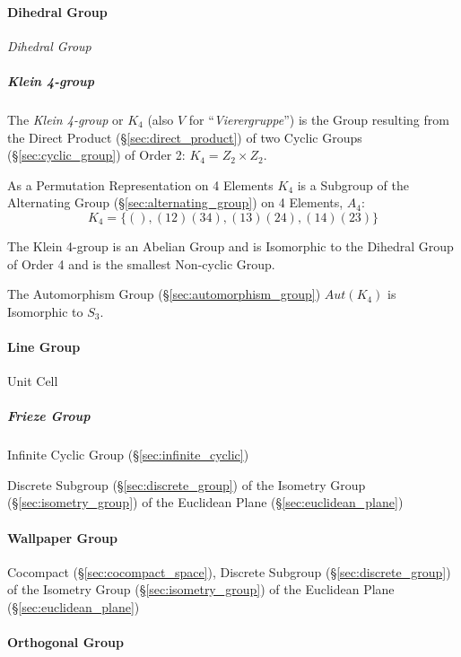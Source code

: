 \begin{itemize}
\paragraph{Dihedral Group}\label{sec:dihedral_group}\hfill

\emph{Dihedral Group}


\subparagraph{Klein 4-group}\label{sec:klein_4group}\hfill

The \emph{Klein 4-group} or $K_4$ (also $V$ for
``\emph{Vierergruppe}'') is the Group resulting from the Direct
Product (\S\ref{sec:direct_product}) of two Cyclic Groups
(\S\ref{sec:cyclic_group}) of Order 2: $K_4 = Z_2 \times Z_2$.

As a Permutation Representation on 4 Elements $K_4$ is a Subgroup of
the Alternating Group (\S\ref{sec:alternating_group}) on 4 Elements,
$A_4$:
\[
    K_4 = \{ (), (12)(34), (13)(24), (14)(23) \}
\]

The Klein 4-group is an Abelian Group and is Isomorphic to the
Dihedral Group of Order 4 and is the smallest Non-cyclic Group.

The Automorphism Group (\S\ref{sec:automorphism_group}) $Aut(K_4)$ is
Isomorphic to $S_3$.



\paragraph{Line Group}\label{sec:line_group}\hfill

Unit Cell



\subparagraph{Frieze Group}\label{sec:frieze_group}\hfill

Infinite Cyclic Group (\S\ref{sec:infinite_cyclic})

Discrete Subgroup (\S\ref{sec:discrete_group}) of the Isometry Group
(\S\ref{sec:isometry_group}) of the Euclidean Plane
(\S\ref{sec:euclidean_plane})



\paragraph{Wallpaper Group}\label{sec:wallpaper_group}\hfill

Cocompact (\S\ref{sec:cocompact_space}), Discrete Subgroup
(\S\ref{sec:discrete_group}) of the Isometry Group (\S\ref{sec:isometry_group})
of the Euclidean Plane (\S\ref{sec:euclidean_plane})



\paragraph{Orthogonal Group}\label{sec:orthogonal_group}\hfill


\end{itemize}
